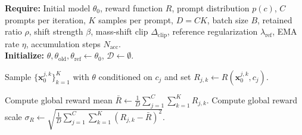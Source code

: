 \documentclass{article} %
\begin{document}
\begin{algorithm}[H]
    \scriptsize
    \setlength{\abovedisplayskip}{1pt}
    \setlength{\belowdisplayskip}{1pt}
    \renewcommand{\arraystretch}{0.9}
    \caption{Scheme B: Symmetric Hard Selection}
    \label{alg:x-prediction-symmetric-hard-selection}
    \textbf{Require:} Initial model $\theta_0$, reward function $R$,
    prompt distribution $p(c)$, $C$
    prompts per iteration, $K$ samples per prompt, $D=CK$, batch size $B$,
    retained ratio $\rho$, shift strength $\beta$, mass-shift clip
    $\Delta_{\mathrm{clip}}$, reference regularization $\lambda_{\mathrm{ref}}$,
    EMA rate $\eta$, accumulation steps $N_{\mathrm{acc}}$.\\
    \textbf{Initialize:}
    $\theta,\theta_{\mathrm{old}},\theta_{\mathrm{ref}}\leftarrow\theta_0$,
    $\mathcal{D}\leftarrow\emptyset$.
    \begin{algorithmic}[1]
                \State Sample $\{\mathbf{x}_0^{j,k}\}_{k=1}^{K}$ with $\theta$
                conditioned on $c_j$ and set
                $R_{j,k}\leftarrow R(\mathbf{x}_0^{j,k},c_j)$.

            \EndFor
            \State Compute global reward mean
            $\bar{R}\leftarrow \frac{1}{D}\sum_{j=1}^{C}\sum_{k=1}^{K}R_{j,k}$.
            \State Compute global reward scale
            $\sigma_R \leftarrow \sqrt{\frac{1}{D}\sum_{j=1}^{C}\sum_{k=1}^{K}(R_{j,k} - \bar{R})^2}.$



\end{algorithmic}
\end{algorithm}
\end{document}
